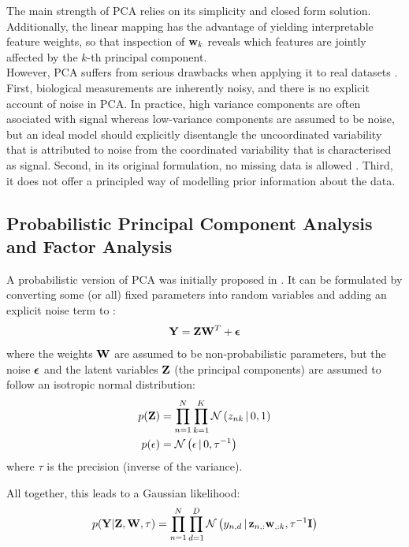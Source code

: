 The main strength of PCA relies on its simplicity and closed form solution. Additionally, the linear mapping has the advantage of yielding interpretable feature weights, so that inspection of ${\bf w}_k$ reveals which features are jointly affected by the $k$-th principal component.\\
However, PCA suffers from serious drawbacks when applying it to real datasets \cite{Li2017b}. First, biological measurements are inherently noisy, and there is no explicit account of noise in PCA. In practice, high variance components are often asociated with signal whereas low-variance components are assumed to be noise, but an ideal model should explicitly disentangle the uncoordinated variability that is attributed to noise from the coordinated variability that is characterised as signal. Second, in its original formulation, no missing data is allowed \cite{Ilin2010}. Third, it does not offer a principled way of modelling prior information about the data.

\subsection{Probabilistic Principal Component Analysis and Factor Analysis} \label{section:probabilistic_pca}
A probabilistic version of PCA was initially proposed in \cite{Tipping1999}. It can be formulated by converting some (or all) fixed parameters into random variables and adding an explicit noise term to :
\begin{equation}
\mathbf{Y} = \mathbf{Z}\mathbf{W}^{T}  + \mbox{\boldmath $\epsilon$}
\end{equation}
where the weights ${\bf W}$ are assumed to be non-probabilistic parameters, but the noise $\mbox{\boldmath $\epsilon$}$ and the latent variables ${\bf Z}$ (the principal components) are assumed to follow an isotropic normal distribution:
\begin{align*}
	p({\bf Z}) &= \prod_{n=1}^{N} \prod_{k=1}^{K} \mathcal{N}\left(z_{nk} \,|\, 0,1\right) \\
	p(\epsilon) &= \mathcal{N}\left(\epsilon \,|\, 0,\tau^{-1}\right)
\end{align*}
where $\tau$ is the precision (inverse of the variance).

All together, this leads to a Gaussian likelihood:
\begin{equation} \label{eq:ppca_lik}
	p({\bf Y}|{\bf Z},{\bf W},\tau) = \prod_{n=1}^{N} \prod_{d=1}^{D} \mathcal{N}\left(y_{n,d} \,|\, {\bf z}_{n,:} {\bf w}_{,:k},\tau^{-1} {\bf I}\right)
\end{equation}

